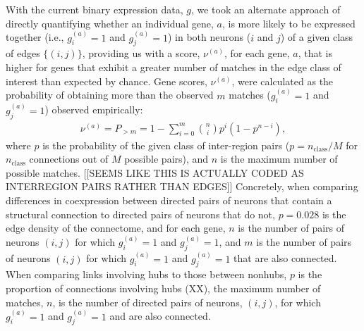 \documentclass[10pt,letterpaper]{article}
\begin{document}
With the current binary expression data, $g$, we took an alternate approach of directly quantifying whether an individual gene, $a$, is more likely to be expressed together (i.e., $g^{(a)}_i = 1$ and $g^{(a)}_j = 1$) in both neurons ($i$ and $j$) of a given class of edges $\{(i,j)\}$, providing us with a score, $\nu^{(a)}$, for each gene, $a$, that is higher for genes that exhibit a greater number of matches in the edge class of interest than expected by chance.
Gene scores, $\nu^{(a)}$, were calculated as the probability of obtaining more than the observed $m$ matches ($g^{(a)}_i = 1$ and $g^{(a)}_j = 1$) observed empirically:
\begin{eqnarray}
	\label{eq:CBinomialProbability}
     \nu^{(a)} = P_{>m} = 1 - \sum_{i=0}^{m}\binom{n}{i} p^{i}(1-p^{n-i}),
\end{eqnarray}
where $p$ is the probability of the given class of inter-region pairs ($p = n_\mathrm{class}/M$ for $n_\mathrm{class}$ connections out of $M$ possible pairs), and $n$ is the maximum number of possible matches.
[[SEEMS LIKE THIS IS ACTUALLY CODED AS INTERREGION PAIRS RATHER THAN EDGES]]
Concretely, when comparing differences in coexpression between directed pairs of neurons that contain a structural connection to directed pairs of neurons that do not, $p = 0.028$ is the edge density of the connectome, and for each gene, $n$ is the number of pairs of neurons $(i,j)$ for which $g^{(a)}_i = 1$ and $g^{(a)}_j = 1$, and $m$ is the number of pairs of neurons $(i,j)$ for which $g^{(a)}_i = 1$ and $g^{(a)}_j = 1$ that are also connected.
When comparing links involving hubs to those between nonhubs, $p$ is the proportion of connections involving hubs (XX), the maximum number of matches, $n$, is the number of directed pairs of neurons, $(i,j)$, for which $g^{(a)}_i = 1$ and $g^{(a)}_j = 1$ and are also connected.
\end{document}
